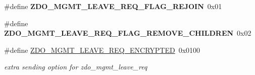 \begin{DoxyCompactItemize}
$$\#define {\bfseries Z\+D\+O\+\_\+\+M\+G\+M\+T\+\_\+\+L\+E\+A\+V\+E\+\_\+\+R\+E\+Q\+\_\+\+F\+L\+A\+G\+\_\+\+R\+E\+J\+O\+IN}~0x01
\item 
\mbox{\label{group__zdo_ga6abdd6bd391973f4fa19747ee6c18a86}} 
\#define {\bfseries Z\+D\+O\+\_\+\+M\+G\+M\+T\+\_\+\+L\+E\+A\+V\+E\+\_\+\+R\+E\+Q\+\_\+\+F\+L\+A\+G\+\_\+\+R\+E\+M\+O\+V\+E\+\_\+\+C\+H\+I\+L\+D\+R\+EN}~0x02
\item 
\mbox{\label{group__zdo_ga2941a931686d22927d9e6a7ad7472737}} 
\#define \hyperlink{group__zdo_ga2941a931686d22927d9e6a7ad7472737}{Z\+D\+O\+\_\+\+M\+G\+M\+T\+\_\+\+L\+E\+A\+V\+E\+\_\+\+R\+E\+Q\+\_\+\+E\+N\+C\+R\+Y\+P\+T\+ED}~0x0100
\begin{DoxyCompactList}\small\item\em extra sending option for zdo\+\_\+mgmt\+\_\+leave\+\_\+req \end{DoxyCompactList}\end{DoxyCompactItemize}

